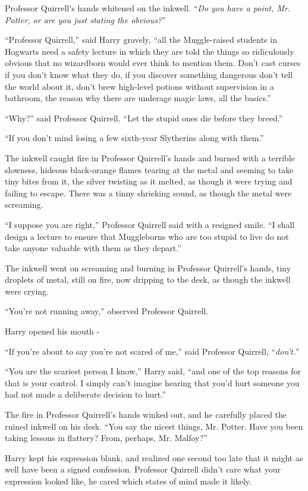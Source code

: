 Professor Quirrell's hands whitened on the inkwell. ``\emph{Do you have a point, Mr. Potter, or are you just stating the obvious?}''

``Professor Quirrell,'' said Harry gravely, ``all the Muggle-raised students in Hogwarts need a safety lecture in which they are told the things so ridiculously obvious that no wizardborn would ever think to mention them. Don't cast curses if you don't know what they do, if you discover something dangerous don't tell the world about it, don't brew high-level potions without supervision in a bathroom, the reason why there are underage magic laws, all the basics.''

``Why?'' said Professor Quirrell. ``Let the stupid ones die before they breed.''

``If you don't mind losing a few sixth-year Slytherins along with them.''

The inkwell caught fire in Professor Quirrell's hands and burned with a terrible slowness, hideous black-orange flames tearing at the metal and seeming to take tiny bites from it, the silver twisting as it melted, as though it were trying and failing to escape. There was a tinny shrieking sound, as though the metal were screaming.

``I suppose you are right,'' Professor Quirrell said with a resigned smile. ``I shall design a lecture to ensure that Muggleborns who are too stupid to live do not take anyone valuable with them as they depart.''

The inkwell went on screaming and burning in Professor Quirrell's hands, tiny droplets of metal, still on fire, now dripping to the desk, as though the inkwell were crying.

``You're not running away,'' observed Professor Quirrell.

Harry opened his mouth -

``If you're about to say you're not scared of me,'' said Professor Quirrell, ``\emph{don't.}''

``You are the scariest person I know,'' Harry said, ``and one of the top reasons for that is your control. I simply can't imagine hearing that you'd hurt someone you had not made a deliberate decision to hurt.''

The fire in Professor Quirrell's hands winked out, and he carefully placed the ruined inkwell on his desk. ``You say the nicest things, Mr. Potter. Have you been taking lessons in flattery? From, perhaps, Mr. Malfoy?''

Harry kept his expression blank, and realized one second too late that it might as well have been a signed confession. Professor Quirrell didn't care what your expression looked like, he cared which states of mind made it likely.

